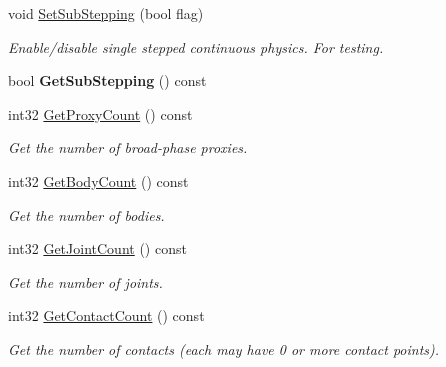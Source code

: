 \begin{DoxyCompactItemize}
void \hyperlink{classb2World_ae8aacc78ea4753075067daff51b61778}{Set\+Sub\+Stepping} (bool flag)
\begin{DoxyCompactList}\small\item\em Enable/disable single stepped continuous physics. For testing. \end{DoxyCompactList}\item 
\mbox{\label{classb2World_aa41f23e3e12f82ce229ce644ecdac28b}} 
bool {\bfseries Get\+Sub\+Stepping} () const
\item 
\mbox{\label{classb2World_a088742d580bfc42531790ea8747bb8f8}} 
int32 \hyperlink{classb2World_a088742d580bfc42531790ea8747bb8f8}{Get\+Proxy\+Count} () const
\begin{DoxyCompactList}\small\item\em Get the number of broad-\/phase proxies. \end{DoxyCompactList}\item 
\mbox{\label{classb2World_a41c8b37baf5165c06932e8f08eb758de}} 
int32 \hyperlink{classb2World_a41c8b37baf5165c06932e8f08eb758de}{Get\+Body\+Count} () const
\begin{DoxyCompactList}\small\item\em Get the number of bodies. \end{DoxyCompactList}\item 
\mbox{\label{classb2World_a98bd6ca53dbc376f210beced33901934}} 
int32 \hyperlink{classb2World_a98bd6ca53dbc376f210beced33901934}{Get\+Joint\+Count} () const
\begin{DoxyCompactList}\small\item\em Get the number of joints. \end{DoxyCompactList}\item 
\mbox{\label{classb2World_aa47375fc3ca9f09d0350c61cfeabcee9}} 
int32 \hyperlink{classb2World_aa47375fc3ca9f09d0350c61cfeabcee9}{Get\+Contact\+Count} () const
\begin{DoxyCompactList}\small\item\em Get the number of contacts (each may have 0 or more contact points). \end{DoxyCompactList}\item 
\mbox{\label{classb2World_abc99b2beb6ba79ac6c80f33bac264b52}} 

\end{DoxyCompactItemize}
